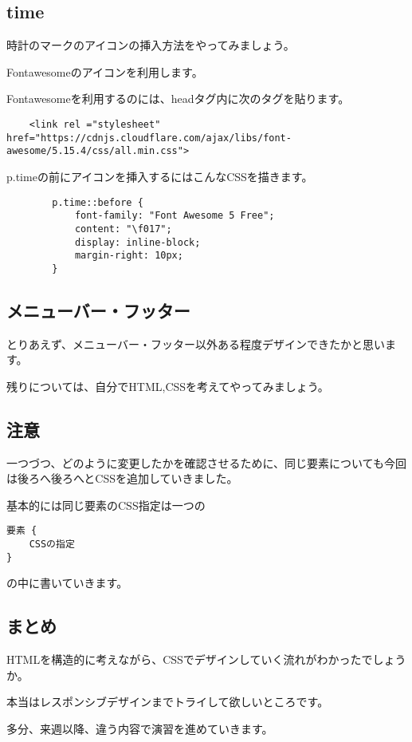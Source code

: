 \documentclass[mingoth,11pt,a4j,uplatex,dvipdfmx]{jsarticle}
\begin{document}
\subsection{time}
時計のマークのアイコンの挿入方法をやってみましょう。

Fontawesomeのアイコンを利用します。

Fontawesomeを利用するのには、headタグ内に次のタグを貼ります。

\begin{lstlisting}
    <link rel ="stylesheet" href="https://cdnjs.cloudflare.com/ajax/libs/font-awesome/5.15.4/css/all.min.css">
\end{lstlisting}

p.timeの前にアイコンを挿入するにはこんなCSSを描きます。

\begin{lstlisting}
        p.time::before {
            font-family: "Font Awesome 5 Free";
            content: "\f017";
            display: inline-block;
            margin-right: 10px;
        }

\end{lstlisting}

\subsection{メニューバー・フッター}
とりあえず、メニューバー・フッター以外ある程度デザインできたかと思います。

残りについては、自分でHTML,CSSを考えてやってみましょう。

\subsection{注意}
一つづつ、どのように変更したかを確認させるために、同じ要素についても今回は後ろへ後ろへとCSSを追加していきました。

基本的には同じ要素のCSS指定は一つの

\begin{lstlisting}
要素 {
	CSSの指定
}
\end{lstlisting}
の中に書いていきます。

\subsection{まとめ}
HTMLを構造的に考えながら、CSSでデザインしていく流れがわかったでしょうか。

本当はレスポンシブデザインまでトライして欲しいところです。

多分、来週以降、違う内容で演習を進めていきます。


\end{document}
